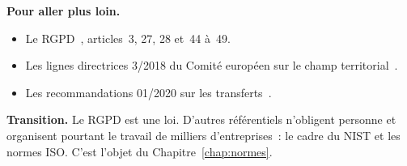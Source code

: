 \bigskip

\begin{boxinfo}
\textbf{Pour aller plus loin.}
\begin{itemize}
    \item Le RGPD~\cite{ue2016rgpd}, articles~3, 27, 28 et~44 à~49.
    \item Les lignes directrices 3/2018 du Comité européen sur le champ
          territorial~\cite{edpb2018territorial}.
    \item Les recommandations 01/2020 sur les transferts~\cite{edpb2020transferts}.
\end{itemize}
\end{boxinfo}

\begin{boxinfo}
\textbf{Transition.} Le RGPD est une loi. D'autres référentiels n'obligent
personne et organisent pourtant le travail de milliers d'entreprises~: le
cadre du NIST et les normes ISO. C'est l'objet du
Chapitre~\ref{chap:normes}.
\end{boxinfo}
